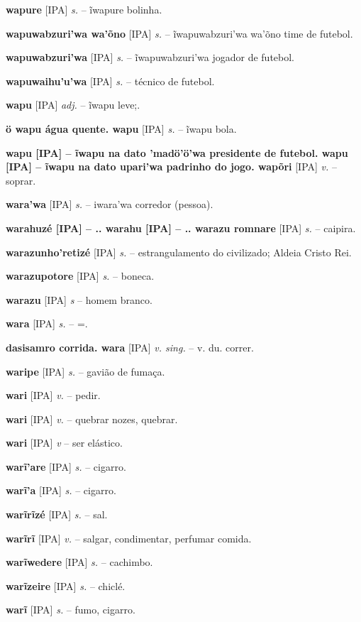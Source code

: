 \textbf{wapure} [IPA] \textit{s.} -- ĩwapure bolinha.

\textbf{wapuwabzuri'wa wa'õno} [IPA] \textit{s.} -- ĩwapuwabzuri'wa wa'õno time de futebol.

\textbf{wapuwabzuri'wa} [IPA] \textit{s.} -- ĩwapuwabzuri'wa jogador de futebol.

\textbf{wapuwaihu'u'wa} [IPA] \textit{s.} -- técnico de futebol.

\textbf{wapu} [IPA] \textit{adj.} -- ĩwapu leve;.

\textbf{ö wapu água quente. wapu} [IPA] \textit{s.} -- ĩwapu bola.

\textbf{wapu [IPA]  -- ĩwapu na dato 'madö'ö'wa presidente de futebol. wapu [IPA]  -- ĩwapu na dato upari'wa padrinho do jogo. wapõri} [IPA] \textit{v.} -- soprar.

\textbf{wara'wa} [IPA] \textit{s.} -- iwara'wa corredor (pessoa).

\textbf{warahuzé [IPA]  -- .. warahu [IPA]  -- .. warazu romnare} [IPA] \textit{s.} -- caipira.

\textbf{warazunho'retizé} [IPA] \textit{s.} -- estrangulamento do civilizado; Aldeia Cristo Rei.

\textbf{warazupotore} [IPA] \textit{s.} -- boneca.

\textbf{warazu} [IPA] \textit{s} -- {homem branco}.

\textbf{wara} [IPA] \textit{s.} -- =.

\textbf{dasisamro corrida. wara} [IPA] \textit{v. sing.} -- v. du. correr.

\textbf{waripe} [IPA] \textit{s.} -- gavião de fumaça.

\textbf{wari} [IPA] \textit{v.} -- pedir.

\textbf{wari} [IPA] \textit{v.} -- quebrar nozes, quebrar.

\textbf{wari} [IPA] \textit{v} -- {ser elástico}.

\textbf{warĩ'are} [IPA] \textit{s.} -- cigarro.

\textbf{warĩ'a} [IPA] \textit{s.} -- cigarro.

\textbf{warĩrĩzé} [IPA] \textit{s.} -- sal.

\textbf{warĩrĩ} [IPA] \textit{v.} -- salgar, condimentar, perfumar comida.

\textbf{warĩwedere} [IPA] \textit{s.} -- cachimbo.

\textbf{warĩzeire} [IPA] \textit{s.} -- chiclé.

\textbf{warĩ} [IPA] \textit{s.} -- fumo, cigarro.

